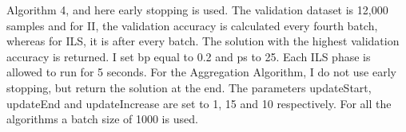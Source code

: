 \begin{center}
\begin{table}[H]
{            Algorithm 4, and here early stopping is used. The validation dataset is 12,000 samples and for
            II, the validation accuracy is calculated every fourth batch, whereas for ILS, it is after every batch.
            The solution with the highest validation accuracy is returned. I set bp equal to 0.2 and ps to 25.
            Each ILS phase is allowed to run for 5 seconds. 
            For the Aggregation Algorithm, I do not use early stopping, but return the solution at the end. The parameters
            updateStart, updateEnd and updateIncrease are set to 1, 15 and 10 respectively. For all the algorithms
            a batch size of 1000 is used. } 
\label{MBT}
\end{table}

\end{center}
